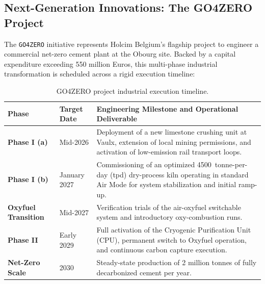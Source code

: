 \subsection{Next-Generation Innovations: The GO4ZERO Project}
The \MakeLowercase{\texttt{GO4ZERO}} initiative represents Holcim Belgium's flagship project to engineer a commercial net-zero cement plant at the Obourg site. Backed by a capital expenditure exceeding \num{550} million Euros, this multi-phase industrial transformation is scheduled across a rigid execution timeline:

\begin{table}[!ht]
\centering
\small
\begin{tabular}{llp{9cm}}
\toprule
\textbf{Phase} & \textbf{Target Date} & \textbf{Engineering Milestone and Operational Deliverable} \\
\midrule
\textbf{Phase I (a)} & Mid-2026 & Deployment of a new limestone crushing unit at Vaulx, extension of local mining permissions, and activation of low-emission rail transport loops. \\
\textbf{Phase I (b)} & January 2027 & Commissioning of an optimized \num{4500}~tonne-per-day (tpd) dry-process kiln operating in standard Air Mode for system stabilization and initial ramp-up. \\
\textbf{Oxyfuel Transition} & Mid-2027 & Verification trials of the air-oxyfuel switchable system and introductory oxy-combustion runs. \\
\textbf{Phase II} & Early 2029 & Full activation of the Cryogenic Purification Unit (CPU), permanent switch to Oxyfuel operation, and continuous carbon capture execution. \\
\textbf{Net-Zero Scale} & 2030 & Steady-state production of \num{2} million tonnes of fully decarbonized cement per year. \\
\bottomrule
\end{tabular}
\caption{GO4ZERO project industrial execution timeline.}
\label{tab:go4zero}
\end{table}


